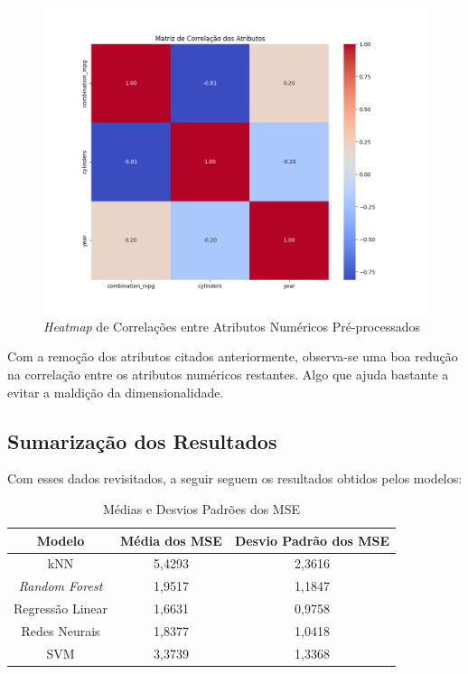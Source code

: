 \documentclass{report}
\begin{document}
\begin{figure}[h!]
  \centering
  \includegraphics[width=.85\linewidth]{images/plots/heatmaps/no_outliers_numeric_atributes_correlation.png}
  \caption{\label{img:pre_num_heatmat} \textit{Heatmap} de Correlações entre Atributos Numéricos Pré-processados}
\end{figure}

Com a remoção dos atributos citados anteriormente, observa-se uma boa redução na correlação entre os atributos numéricos restantes. Algo que ajuda bastante a evitar a maldição da dimensionalidade.

\subsection{Sumarização dos Resultados}

Com esses dados revisitados, a seguir seguem os resultados obtidos pelos modelos:

\begin{table}[h!]
  \centering
  \begin{tabular}{| c | c | c |}
      \hline
      \rowcolor{lightgray}
      \textbf{Modelo} & \textbf{Média dos MSE} & \textbf{Desvio Padrão dos MSE} \\
      \hline
      kNN & 5,4293 & 2,3616 \\
      \hline
      \textit{Random Forest} & 1,9517 & 1,1847 \\
      \hline
      Regressão Linear & 1,6631 & 0,9758 \\
      \hline
      Redes Neurais & 1,8377 & 1,0418 \\
      \hline
      SVM & 3,3739 & 1,3368 \\
      \hline
  \end{tabular}
  \caption{\label{table:model_summary} Médias e Desvios Padrões dos MSE}
\end{table}
\end{document}
